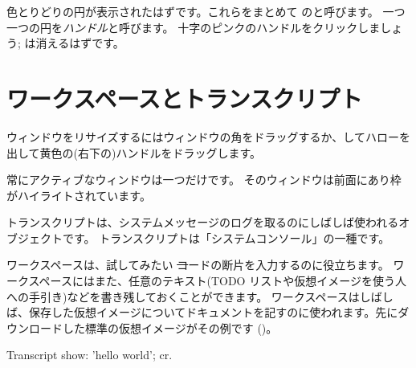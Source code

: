 \documentclass[a4paper,10pt,twoside]{book}
\begin{document}
色とりどりの円が表示されたはずです。これらをまとめて \bam のと呼びます。
一つ一つの円を\emph{ハンドル}と呼びます。
十字のピンクのハンドルをクリックしましょう; \bam は消えるはずです。

\section{ワークスペースとトランスクリプト}


ウィンドウをリサイズするにはウィンドウの角をドラッグするか、\metaclick してハローを出して黄色の(右下の)ハンドルをドラッグします。

常にアクティブなウィンドウは一つだけです。 そのウィンドウは前面にあり枠がハイライトされています。

トランスクリプトは、システムメッセージのログを取るのにしばしば使われるオブジェクトです。
トランスクリプトは「システムコンソール」の一種です。

ワークスペースは、試してみたい \st コードの断片を入力するのに役立ちます。
ワークスペースにはまた、任意のテキスト(TODO リストや仮想イメージを使う人への手引き)などを書き残しておくことができます。
ワークスペースはしばしば、保存した仮想イメージについてドキュメントを記すのに使われます。先にダウンロードした標準の仮想イメージがその例です ()。

\begin{code}{}
Transcript show: 'hello world'; cr.
\end{code}
\end{document}
